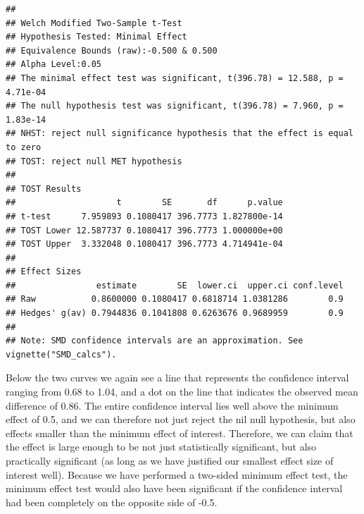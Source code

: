 \documentclass[
  oneside]{book}
\begin{document}
\begin{verbatim}
## 
## Welch Modified Two-Sample t-Test
## Hypothesis Tested: Minimal Effect
## Equivalence Bounds (raw):-0.500 & 0.500
## Alpha Level:0.05
## The minimal effect test was significant, t(396.78) = 12.588, p = 4.71e-04
## The null hypothesis test was significant, t(396.78) = 7.960, p = 1.83e-14
## NHST: reject null significance hypothesis that the effect is equal to zero 
## TOST: reject null MET hypothesis
## 
## TOST Results 
##                    t        SE       df      p.value
## t-test      7.959893 0.1080417 396.7773 1.827800e-14
## TOST Lower 12.587737 0.1080417 396.7773 1.000000e+00
## TOST Upper  3.332048 0.1080417 396.7773 4.714941e-04
## 
## Effect Sizes 
##                estimate        SE  lower.ci  upper.ci conf.level
## Raw           0.8600000 0.1080417 0.6818714 1.0381286        0.9
## Hedges' g(av) 0.7944836 0.1041808 0.6263676 0.9689959        0.9
## 
## Note: SMD confidence intervals are an approximation. See vignette("SMD_calcs").
\end{verbatim}

Below the two curves we again see a line that represents the confidence interval ranging from 0.68 to 1.04, and a dot on the line that indicates the observed mean difference of 0.86. The entire confidence interval lies well above the minimum effect of 0.5, and we can therefore not just reject the nil null hypothesis, but also effects smaller than the minimum effect of interest. Therefore, we can claim that the effect is large enough to be not just statistically significant, but also practically significant (as long as we have justified our smallest effect size of interest well). Because we have performed a two-sided minimum effect test, the minimum effect test would also have been significant if the confidence interval had been completely on the opposite side of -0.5.
\end{document}
